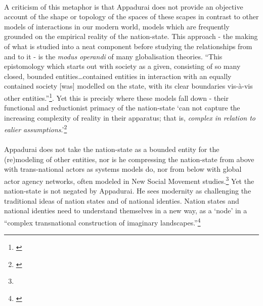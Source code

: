 \documentclass{article}
\begin{document}
\paragraph{}A criticism of this metaphor is that Appadurai does not provide an objective account of the shape or topology of the spaces of these scapes in contrast to other models of interactions in our modern world, models which are frequently grounded on the empirical reality of the nation-state. This approach - the making of what is studied into a neat component before studying the relationships from and to it - is the \emph{modus operandi} of many globalisation theories. ``This epistomology which starts out with society as a given, consisting of so many closed, bounded entities\ldots contained entities in interaction with an equally contained society [was] modelled on the state, with its clear boundaries vis-\`{a}-vis other entities.''\footnote{\cite[p.126]{Nustad:2003}}. Yet this is precisly where these models fall down - their functional and reductionist primacy of the nation-state `can not capture the increasing complexity of reality in their apparatus; that is, \emph{complex in relation to ealier assumptions}.'\footnote{\cite[p. 126, emphasis added]{Nustad:2003}}

\paragraph{}Appadurai does not take the nation-state as a bounded entity for the (re)modeling of other entities, nor is he compressing the nation-state from above with trans-national actors as systems models do, nor from below with global actor agency networks, often modeled in New Social Movement studies.\footnote{} Yet the nation-state is not negated by Appadurai. He sees modernity as challenging the traditional ideas of nation states and of national identies. Nation states and national identies need to understand themselves in a new way, as a `node' in a ``complex transnational construction of imaginary landscapes.''\footnote{\cite[p.31]{Appadurai:1996lp}}
\end{document}
